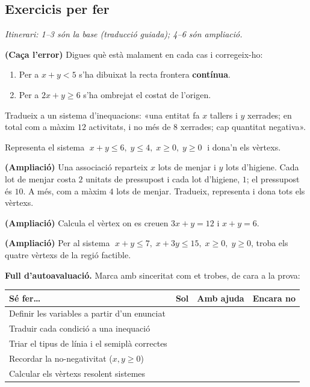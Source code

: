 \subsection{Exercicis per fer}

\noindent\textit{Itinerari: 1–3 són la base (traducció guiada); 4–6 són ampliació.}

\begin{exercicis}
\begin{exlist}
  \item \textbf{(Caça l'error)} Digues què està malament en cada cas i corregeix-ho:
        \begin{enumerate}[label=\alph*), leftmargin=1.6em, topsep=2pt]
          \item Per a $x+y<5$ s'ha dibuixat la recta frontera \textbf{contínua}.
          \item Per a $2x+y\ge 6$ s'ha ombrejat el costat de l'origen.
        \end{enumerate}
  \item Tradueix a un sistema d'inequacions: «una entitat fa $x$ tallers i $y$ xerrades;
        en total com a màxim $12$ activitats, i no més de $8$ xerrades; cap quantitat
        negativa».
  \item Representa el sistema $\;x+y\le 6,\;y\le 4,\;x\ge 0,\;y\ge 0\;$ i dona'n els
        vèrtexs.
  \item \textbf{(Ampliació)} Una associació reparteix $x$ lots de menjar i $y$ lots
        d'higiene. Cada lot de menjar costa $2$ unitats de pressupost i cada lot
        d'higiene, $1$; el pressupost és $10$. A més, com a màxim $4$ lots de menjar.
        Tradueix, representa i dona tots els vèrtexs.
  \item \textbf{(Ampliació)} Calcula el vèrtex on es creuen $3x+y=12$ i $x+y=6$.
  \item \textbf{(Ampliació)} Per al sistema $\;x+y\le 7,\;x+3y\le 15,\;x\ge 0,\;y\ge 0$,
        troba els quatre vèrtexs de la regió factible.
\end{exlist}
\end{exercicis}

\begin{idea}
\textbf{Full d'autoavaluació.} Marca amb sinceritat com et trobes, de cara a la prova:
\begin{center}
\renewcommand{\arraystretch}{1.4}
\begin{tabular}{p{8.4cm} c c c}
\toprule
\textbf{Sé fer\dots} & \textbf{Sol} & \textbf{Amb ajuda} & \textbf{Encara no} \\
\midrule
Definir les variables a partir d'un enunciat & & & \\
Traduir cada condició a una inequació & & & \\
Triar el tipus de línia i el semiplà correctes & & & \\
Recordar la no-negativitat ($x,y\ge 0$) & & & \\
Calcular els vèrtexs resolent sistemes & & & \\
\bottomrule
\end{tabular}
\end{center}
\end{idea}

